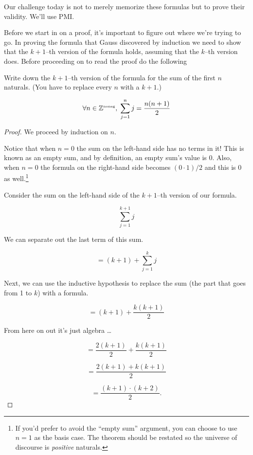 Our challenge today is not to merely memorize these formulas but
to prove their validity.  We'll use PMI.

Before we start in on a proof, it's important to figure out where 
we're trying to go.  In proving the formula that Gauss discovered
by induction we need to show that the $k+1$--th version of the 
formula holds, assuming that the $k$--th version does.  Before
proceeding on to read the proof do the following

\begin{exer}
Write down the $k+1$--th version of the formula for the sum of
the first $n$ naturals.  (You have to replace every $n$ with 
a $k+1$.)
\end{exer}

\begin{thm}
\[ \forall n \in {\mathbb Z}^{\mbox{\tiny noneg}}, \; \sum_{j=1}^n j = \frac{n(n+1)}{2} \]
\end{thm}

\begin{proof}
We proceed by induction on $n$.

  Notice that when $n=0$ the sum on the left-hand side
has no terms in it!  This is known as an  empty sum, and by 
definition, an empty sum's value is $0$.   Also, when 
$n=0$ the formula on the right-hand side becomes $(0 \cdot 1)/2$ and this is 
$0$ as well.\footnote{If you'd prefer to avoid the ``empty sum'' argument, %
you can choose to use $n=1$ as the basis case.  The theorem should %
be restated so the universe of discourse is \emph{positive} naturals.}

  Consider the sum on the left-hand side of
the $k+1$--th version of our formula.

\[ \sum_{j=1}^{k+1} j \]

We can separate out the last term of this sum.

\[ = (k+1) + \sum_{j=1}^{k} j \]

Next, we can use the inductive hypothesis to replace the sum (the part 
that goes from 1 to $k$) with a formula.

\[ = (k+1) + \frac{k(k+1)}{2} \]

From here on out it's just algebra \ldots

\[ = \frac{2(k+1)}{2} + \frac{k(k+1)}{2} \]

\[ = \frac{2(k+1) + k(k+1)}{2} \]

\[ = \frac{(k+1) \cdot (k+2)}{2}. \]

\end{proof}
\medskip

